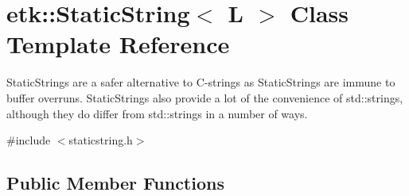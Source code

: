 \hypertarget{classetk_1_1_static_string}{\section{etk\-:\-:Static\-String$<$ L $>$ Class Template Reference}
\label{classetk_1_1_static_string}
}


Static\-Strings are a safer alternative to C-\/strings as Static\-Strings are immune to buffer overruns. Static\-Strings also provide a lot of the convenience of std\-::strings, although they do differ from std\-::strings in a number of ways.  




{\ttfamily \#include $<$staticstring.\-h$>$}

\subsection*{Public Member Functions}

